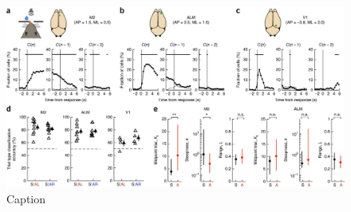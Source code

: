 \begin{figure}[htbp]

\begin{center}
\includegraphics[width=\textwidth]{Figures/NN_fig7.jpg} 
\end{center}

\caption[Comparison between neural activity patterns in M2, ALM, and V1 during flexible sensorimotor behavior]
{Caption}

\label{fig:NN_fig7}
\end{figure}